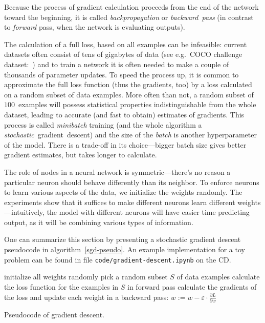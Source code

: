 Because the process of gradient calculation proceeds from the end of the network toward the beginning, it is called \emph{backpropagation} or \emph{backward~pass} (in contrast to \emph{forward} pass, when the network is evaluating outputs).

The calculation of a full loss, based on all examples can be infeasible: current datasets often consist of tens of gigabytes of data (see e.g.~COCO challenge dataset:~\cite{coco-dataset}) and to train a network it is often needed to make a couple of thousands of parameter updates.
To speed the process up, it is common to approximate the full loss function (thus the gradients, too) by a loss calculated on a random subset of data examples. More often than not, a random subset of $100$~examples will possess statistical properties indistinguishable from the whole dataset, leading to accurate (and fast to obtain) estimates of gradients. This process is called \emph{minibatch} training (and the whole algorithm a \emph{stochastic}~gradient~descent) and the size of the \emph{batch} is another hyperparameter of the model. There is a trade-off in its choice---bigger batch size gives better gradient estimates, but takes longer to calculate.

The role of nodes in a neural network is symmetric---there's no reason a particular neuron should behave differently than its neighbor. To enforce neurons to learn various aspects of the data, we initialize the weights randomly. The experiments show that it suffices to make different neurons learn different weights---intuitively, the model with different neurons will have easier time predicting output, as it will be combining various types of information.

One can summarize this section by presenting a stochastic gradient descent pseudocode in algorithm~\ref{sgd-pseudo}. An example implementation for a toy problem can be found in file \texttt{code/gradient-descent.ipynb} on the CD.

\begin{algorithm} \label{sgd-pseudo}
  initialize all weights randomly\;
   {
    pick a random subset $S$ of data examples\;
    calculate the loss function for the examples in $S$ in forward pass\;
    calculate the gradients of the loss and update each weight in a backward pass:
    $w := w - \varepsilon \cdot \frac{\partial L}{\partial w}$
  }
  \caption{Pseudocode of gradient descent.}
\end{algorithm}

